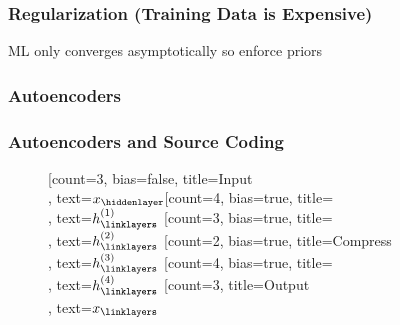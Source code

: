 \documentclass{beamer}
\begin{document}
\begin{frame}
	\frametitle{Regularization (Training Data is Expensive)}
	ML only converges asymptotically so enforce priors
\end{frame}


\subsubsection{Autoencoders}


\begin{frame}[fragile]
	\frametitle{Autoencoders and Source Coding}
	\begin{figure}
		\begin{neuralnetwork}[height=4, nodespacing=10mm, layerspacing=15mm]
		\newcommand{\x}[2]{$x_#2$}
		\newcommand{\y}[2]{$\hat{y}_#2$}
		\newcommand{\hfirst}[2]{\small $h^{(1)}_#2$}
		\newcommand{\hsecond}[2]{\small $h^{(2)}_#2$}
		\newcommand{\hthird}[2]{\small $h^{(3)}_#2$}
		\newcommand{\hfourth}[2]{\small $h^{(4)}_#2$}
		\newcommand{\hfifth}[2]{\small $h^{(5)}_#2$}
		\newcommand{\hsixth}[2]{\small $h^{(6)}_#2$}
		[count=3, bias=false, title=Input\\, text=\x]
		\hiddenlayer[count=4, bias=true, title=\\, text=\hfirst] \linklayers
		\hiddenlayer[count=3, bias=true, title=\\, text=\hsecond] \linklayers
		\hiddenlayer[count=2, bias=true, title=Compress\\, text=\hthird] \linklayers
		\hiddenlayer[count=4, bias=true, title=\\, text=\hfourth] \linklayers
		\outputlayer[count=3, title=Output\\, text=\x] \linklayers
	    \end{neuralnetwork}
	\end{figure}
\end{frame}


\end{document}
